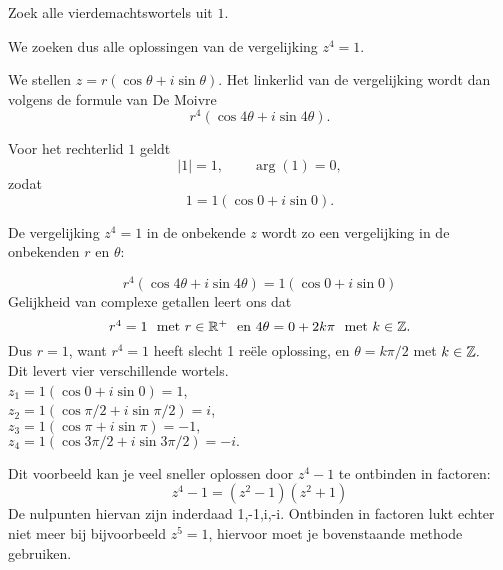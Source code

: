\documentclass{ximera}
\begin{document}
\begin{example}
	Zoek alle vierdemachtswortels uit $1$.
	\begin{oplossing}
	We zoeken dus alle oplossingen van de vergelijking $z^4=1.$
	
	We stellen $z = r(\cos\theta+i\sin\theta)$. 
	Het linkerlid van de vergelijking wordt dan volgens de formule van De Moivre $$r^4(\cos 4\theta+i\sin 4\theta).$$
	
	Voor het rechterlid $1$ geldt
	\[ |1| = 1, \qquad \arg (1) = 0, \]
	zodat
	\[ 1 = 1(\cos 0+i\sin 0). \]
	
	De
	vergelijking $z^4=1$ in de onbekende $z$ wordt zo een vergelijking in de onbekenden $r$ en $\theta$:
	
	$$r^4(\cos 4\theta+i\sin 4\theta) =1(\cos 0+i\sin 0)$$
	Gelijkheid van complexe getallen leert ons dat $$\mbox{$r^4=1$ \text{ met }$r\in \mathbb{R}^+$ \text{ en }$4\theta
		=0+2k\pi$ \text{ met }$k\in \mathbb{Z}.$}$$ Dus $r=1$, want $r^4=1$ heeft slecht 1 reële oplossing, en $\theta=k\pi/2$ met $k\in
	\mathbb{Z}.$
	\\ Dit levert vier verschillende wortels.
	\\$z_1=1(\cos 0+i\sin 0)=1$,
	\\$z_2=1(\cos \pi/2+i\sin \pi/2) =i$,
	\\$z_3=1 (\cos \pi+i\sin \pi) =-1,$
	\\$z_4=1 (\cos 3\pi/2+i\sin 3\pi/2)=-i.$
	
	
	Dit voorbeeld kan je veel sneller oplossen door $z^4-1$ te ontbinden in factoren:
	$$ z^4-1=(z^2-1)(z^2+1)$$
	De nulpunten hiervan zijn inderdaad 1,-1,i,-i. Ontbinden in factoren lukt echter niet meer bij bijvoorbeeld $z^5=1$, hiervoor moet je bovenstaande methode gebruiken.
	\end{oplossing}
	\end{example}
\end{document}

